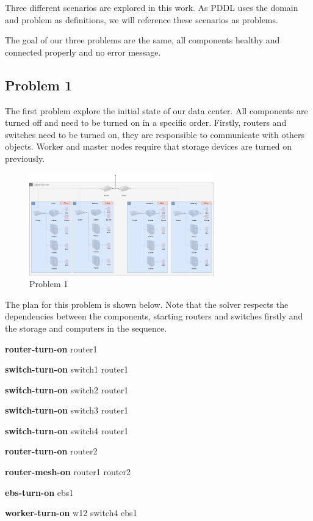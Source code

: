 \documentclass[letterpaper]{article}
\begin{document}
Three different scenarios are explored in this work. As PDDL uses the domain and problem as definitions, we will reference these scenarios as problems.

The goal of our three problems are the same, all components healthy and connected properly and no error message.

\subsection{Problem 1}\label{sec:experiments1}

The first problem explore the initial state of our data center. All components are turned off and need to be turned on in a specific order. Firstly, routers and switches need to be turned on, they are responsible to communicate with others objects. Worker and master nodes require that storage devices are turned on previously.

\begin{figure}[ht]
    \centering
    \includegraphics[width=8cm]{images/diagrams-pb1.png}
    \caption{Problem 1}
    \label{fig:data-center-pb1}
\end{figure}

The plan for this problem is shown below. Note that the solver respects the dependencies between the components, starting routers and switches firstly and the storage and computers in the sequence.

\textbf{router-turn-on} router1 

\textbf{switch-turn-on} switch1 router1 

\textbf{switch-turn-on} switch2 router1 

\textbf{switch-turn-on} switch3 router1 

\textbf{switch-turn-on} switch4 router1 

\textbf{router-turn-on} router2 

\textbf{router-mesh-on} router1 router2 

\textbf{ebs-turn-on} ebs1 

\textbf{worker-turn-on} w12 switch4 ebs1 
\end{document}
